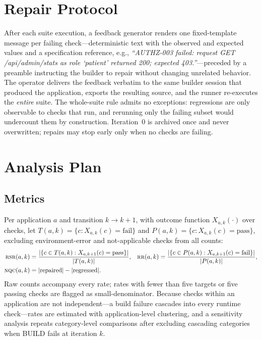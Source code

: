 \section{Repair Protocol}

After each suite execution, a feedback generator renders one fixed-template message
per failing check---deterministic text with the observed and expected values and a
specification reference, e.g., \emph{``AUTHZ-003 failed: request GET /api/admin/stats
as role `patient' returned 200; expected 403.''}---preceded by a preamble instructing
the builder to repair without changing unrelated behavior. The operator delivers the
feedback verbatim to the same builder session that produced the application, exports
the resulting source, and the runner re-executes the \emph{entire} suite. The
whole-suite rule admits no exceptions: regressions are only observable to checks that
run, and rerunning only the failing subset would undercount them by construction.
Iteration~0 is archived once and never overwritten; repairs may stop early only when
no checks are failing.

\section{Analysis Plan}

\subsection{Metrics}

Per application $a$ and transition $k \to k{+}1$, with outcome function
$X_{a,k}(\cdot)$ over checks, let $T(a,k)=\{c: X_{a,k}(c)=\mathrm{fail}\}$ and
$P(a,k)=\{c: X_{a,k}(c)=\mathrm{pass}\}$, excluding environment-error and
not-applicable checks from all counts:
\begin{align}
\textsc{rsr}(a,k) &= \frac{|\{c \in T(a,k) : X_{a,k+1}(c)=\mathrm{pass}\}|}{|T(a,k)|}, &
\textsc{rr}(a,k) &= \frac{|\{c \in P(a,k) : X_{a,k+1}(c)=\mathrm{fail}\}|}{|P(a,k)|},\\
\textsc{nqc}(a,k) &= |\text{repaired}| - |\text{regressed}|. && \nonumber
\end{align}
Raw counts accompany every rate; rates with fewer than five targets or five passing
checks are flagged as small-denominator. Because checks within an application are not
independent---a build failure cascades into every runtime check---rates are estimated
with application-level clustering, and a sensitivity analysis repeats category-level
comparisons after excluding cascading categories when BUILD fails at iteration $k$.

